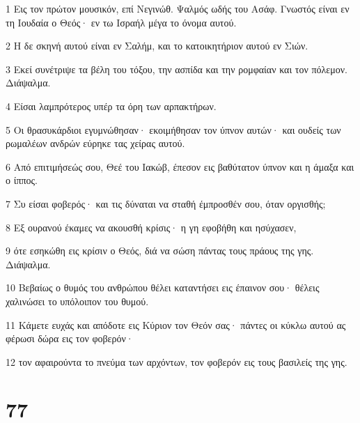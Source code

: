 \par 1 Εις τον πρώτον μουσικόν, επί Νεγινώθ. Ψαλμός ωδής του Ασάφ. Γνωστός είναι εν τη Ιουδαία ο Θεός· εν τω Ισραήλ μέγα το όνομα αυτού.
\par 2 Η δε σκηνή αυτού είναι εν Σαλήμ, και το κατοικητήριον αυτού εν Σιών.
\par 3 Εκεί συνέτριψε τα βέλη του τόξου, την ασπίδα και την ρομφαίαν και τον πόλεμον. Διάψαλμα.
\par 4 Είσαι λαμπρότερος υπέρ τα όρη των αρπακτήρων.
\par 5 Οι θρασυκάρδιοι εγυμνώθησαν· εκοιμήθησαν τον ύπνον αυτών· και ουδείς των ρωμαλέων ανδρών εύρηκε τας χείρας αυτού.
\par 6 Από επιτιμήσεώς σου, Θεέ του Ιακώβ, έπεσον εις βαθύτατον ύπνον και η άμαξα και ο ίππος.
\par 7 Συ είσαι φοβερός· και τις δύναται να σταθή έμπροσθέν σου, όταν οργισθής;
\par 8 Εξ ουρανού έκαμες να ακουσθή κρίσις· η γη εφοβήθη και ησύχασεν,
\par 9 ότε εσηκώθη εις κρίσιν ο Θεός, διά να σώση πάντας τους πράους της γης. Διάψαλμα.
\par 10 Βεβαίως ο θυμός του ανθρώπου θέλει καταντήσει εις έπαινον σου· θέλεις χαλινώσει το υπόλοιπον του θυμού.
\par 11 Κάμετε ευχάς και απόδοτε εις Κύριον τον Θεόν σας· πάντες οι κύκλω αυτού ας φέρωσι δώρα εις τον φοβερόν·
\par 12 τον αφαιρούντα το πνεύμα των αρχόντων, τον φοβερόν εις τους βασιλείς της γης.

\chapter{77}

